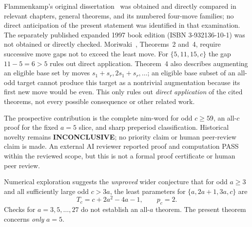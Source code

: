 \documentclass[10pt,a4paper]{article}
\begin{document}
Flammenkamp's original dissertation~\cite{Flammenkamp} was obtained and directly compared in relevant chapters, general theorems, and its numbered four-move families; no direct anticipation of the present statement was identified in that examination. The separately published expanded 1997 book edition (ISBN 3-932136-10-1) was not obtained or directly checked. Moriwaki~\cite{Moriwaki}, Theorems~2 and~4, require successive move gaps not to exceed the least move. For $\{5,11,15,c\}$ the gap $11-5=6>5$ rules out direct application. Theorem~4 also describes augmenting an eligible base set by moves $s_1+s_r,2s_1+s_r,\ldots$; an eligible base subset of an all-odd target cannot produce this target as a nontrivial augmentation because its first new move would be even. This only rules out \emph{direct application} of the cited theorems, not every possible consequence or other related work.

The prospective contribution is the complete nim-word for odd $c\ge59$, an all-$c$ proof for the fixed $a=5$ slice, and sharp preperiod classification. Historical novelty remains \textbf{INCONCLUSIVE}; no priority claim or human peer-review claim is made. An external AI reviewer reported proof and computation PASS within the reviewed scope, but this is not a formal proof certificate or human peer review.

Numerical exploration suggests the \emph{unproved} wider conjecture that for odd $a\ge3$ and all sufficiently large odd $c>3a$, the least parameters for $\{a,2a+1,3a,c\}$ are
\[
 T_c=c+2a^2-4a-1,\qquad p_c=2.
\]
Checks for $a=3,5,\ldots,27$ do not establish an all-$a$ theorem. The present theorem concerns \emph{only} $a=5$. 
\end{document}

